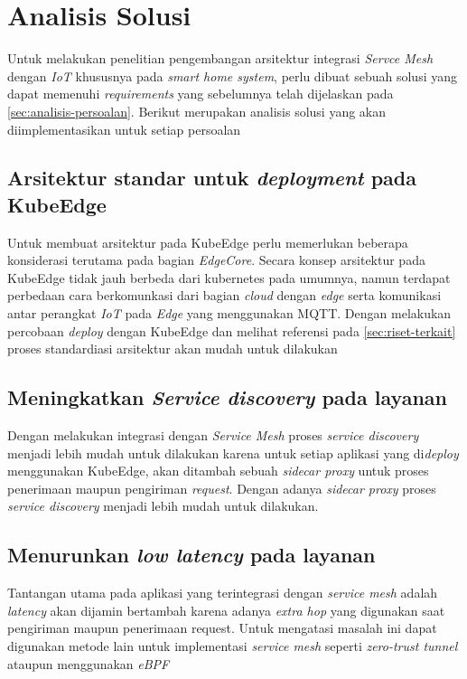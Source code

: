 \section{Analisis Solusi}

Untuk melakukan penelitian pengembangan arsitektur integrasi \textit{Servce Mesh} dengan \textit{IoT} khususnya pada \textit{smart home system}, perlu dibuat sebuah solusi yang dapat memenuhi \textit{requirements} yang sebelumnya telah dijelaskan pada \ref{sec:analisis-persoalan}. Berikut merupakan analisis solusi yang akan diimplementasikan untuk setiap persoalan

\subsection{Arsitektur standar untuk \textit{deployment} pada KubeEdge}
Untuk membuat arsitektur pada KubeEdge perlu memerlukan beberapa konsiderasi terutama pada bagian \textit{EdgeCore}. Secara konsep arsitektur pada KubeEdge tidak jauh berbeda dari kubernetes pada umumnya, namun terdapat perbedaan cara berkomunkasi dari bagian \textit{cloud} dengan \textit{edge} serta komunikasi antar perangkat \textit{IoT} pada \textit{Edge} yang menggunakan MQTT. Dengan melakukan percobaan \textit{deploy} dengan KubeEdge dan melihat referensi pada \ref{sec:riset-terkait} proses standardiasi arsitektur akan mudah untuk dilakukan

\subsection{Meningkatkan \textit{Service discovery} pada layanan}
Dengan melakukan integrasi dengan \textit{Service Mesh} proses \textit{service discovery} menjadi lebih mudah untuk dilakukan karena untuk setiap aplikasi yang di\textit{deploy} menggunakan KubeEdge, akan ditambah sebuah \textit{sidecar proxy} untuk proses penerimaan maupun pengiriman \textit{request}. Dengan adanya \textit{sidecar proxy} proses \textit{service discovery} menjadi lebih mudah untuk dilakukan.

\subsection{Menurunkan \textit{low latency} pada layanan}
Tantangan utama pada aplikasi yang terintegrasi dengan \textit{service mesh} adalah \textit{latency} akan dijamin bertambah karena adanya \textit{extra hop} yang digunakan saat pengiriman maupun penerimaan request. Untuk mengatasi masalah ini dapat digunakan metode lain untuk implementasi \textit{service mesh} seperti \textit{zero-trust tunnel} ataupun menggunakan \textit{eBPF}
